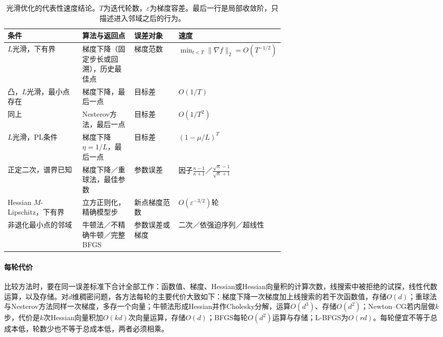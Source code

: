 \begin{table}[htbp]
  \centering
  \small
  \begin{tabularx}{\linewidth}{@{}>{\raggedright\arraybackslash}p{0.27\linewidth}>{\raggedright\arraybackslash}X>{\raggedright\arraybackslash}p{0.16\linewidth}>{\raggedright\arraybackslash}p{0.2\linewidth}@{}}
    \toprule
    条件 & 算法与返回点 & 误差对象 & 速度 \\
    \midrule
    $L$光滑，下有界 & 梯度下降（固定步长或回溯），历史最佳点 & 梯度范数 & $\min_{t<T}\lVert\nabla f\rVert_2=O(T^{-1/2})$ \\
    凸，$L$光滑，最小点存在 & 梯度下降，最后一点 & 目标差 & $O(1/T)$ \\
    同上 & Nesterov方法，最后一点 & 目标差 & $O(1/T^2)$ \\
    $L$光滑，PL条件 & 梯度下降$\eta=1/L$，最后一点 & 目标差 & $(1-\mu/L)^T$ \\
    正定二次，谱界已知 & 梯度下降／重球法，最佳参数 & 参数误差 & 因子$\tfrac{\kappa-1}{\kappa+1}$／$\tfrac{\sqrt\kappa-1}{\sqrt\kappa+1}$ \\
    Hessian $M$-Lipschitz，下有界 & 立方正则化，精确模型步 & 新点梯度范数 & $O(\varepsilon^{-3/2})$轮 \\
    非退化最小点的邻域 & 牛顿法／不精确牛顿／完整BFGS & 参数误差或梯度 & 二次／依强迫序列／超线性 \\
    \bottomrule
  \end{tabularx}
  \caption{光滑优化的代表性速度结论。$T$为迭代轮数，$\varepsilon$为梯度容差。最后一行是局部收敛阶，只描述进入邻域之后的行为。}
  \label{tab:opt-smooth-rates}
\end{table}

\paragraph{每轮代价}
比较方法时，要在同一误差标准下合计全部工作：函数值、梯度、Hessian或Hessian向量积的计算次数，线搜索中被拒绝的试探，线性代数运算，以及存储。对$d$维稠密问题，各方法每轮的主要代价大致如下：梯度下降一次梯度加上线搜索的若干次函数值，存储$O(d)$；重球法与Nesterov方法同样一次梯度，多存一个向量；牛顿法形成Hessian并作Cholesky分解，运算$O(d^3)$、存储$O(d^2)$；Newton--CG若内层做$k$步，代价是$k$次Hessian向量积加$O(kd)$次向量运算，存储$O(d)$；BFGS每轮$O(d^2)$运算与存储；L-BFGS为$O(rd)$。每轮便宜不等于总成本低，轮数少也不等于总成本低，两者必须相乘。

